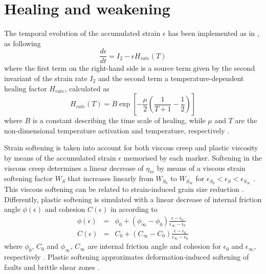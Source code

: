 \section{Healing and weakening}\label{sec:healing}
The temporal evolution of the accumulated strain $\epsilon$ has been implemented as in \citet{Fuchs2019,Fuchs2021}, as following
\begin{equation}\label{eq:healing}
  \frac{d\epsilon}{dt}=I_2 - \epsilon H_{rate}(T)
\end{equation}
where the first term on the right-hand side is a source term given by the second invariant of the strain rate $I_2$ and the second term a
temperature-dependent healing factor $H_{rate}$, calculated as
\begin{equation}\label{eq:healing_rate}
  H_{rate}(T)=B \exp \left[-\frac{\mu}{2}\left(\frac{1}{T+1}-\frac{1}{2}\right)\right]
\end{equation}
where $B$ is a constant describing the time scale of healing, while $\mu$ and $T$ are the non-dimensional temperature activation and temperature,
respectively \citep{Fuchs2019,Fuchs2021}.

Strain softening is taken into account for both viscous creep and plastic viscosity \citep{Huismans2003,Babeyko2005,Huismans2005,Sobolev2005,Warren2008a} by
means of the accumulated strain $\epsilon$ memorised by each marker. Softening in the viscous creep determines a linear decrease of $\eta_{vc}$ by means of a
viscous strain softening factor $W_S$ that increases linearly from $W_{S_0}$ to $W_{S_{\infty}}$ for $\epsilon_{S_0}<\epsilon_S<\epsilon_{S_{\infty}}$ 
\citep{Warren2008a}. This viscous softening can be related to strain-induced grain size reduction \citep{Warren2008a}. Differently, plastic softening is 
simulated with a linear decrease of internal friction angle $\phi(\epsilon)$ and cohesion $C(\epsilon)$ in according to
\begin{eqnarray}
\label{eq:friction1}\phi(\epsilon)&=&\phi_0+(\phi_{\infty}-\phi_0)\frac{\epsilon-\epsilon_0}{\epsilon_{\infty}-\epsilon_0}\\
\label{eq:friction2}C(\epsilon)&=&C_0+(C_{\infty}-C_0)\frac{\epsilon-\epsilon_0}{\epsilon_{\infty}-\epsilon_0}
\end{eqnarray}
where $\phi_0$, $C_0$ and $\phi_{\infty}$, $C_{\infty}$ are internal friction angle and cohesion for $\epsilon_0$ and $\epsilon_{\infty}$, respectively
\citep{Huismans2003,Huismans2005,Warren2008a,Thieulot2014}. Plastic softening approximates deformation-induced softening of faults and brittle shear zones
\citep{Warren2008a}.